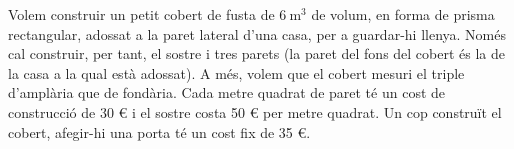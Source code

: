Volem construir un petit cobert de fusta de $6\ \text{m}^3$ de volum, en forma de prisma rectangular, adossat a la
paret lateral d'una casa, per a guardar-hi llenya. Només cal construir, per tant, el sostre i tres parets (la
paret del fons del cobert és la de la casa a la qual està adossat). A més, volem que el cobert mesuri el triple
d'amplària que de fondària. Cada metre quadrat de paret té un cost de construcció de 30 € i el sostre costa 50 €
per metre quadrat. Un cop construït el cobert, afegir-hi una porta té un cost fix de 35 €.
\begin{center}
\end{center}

